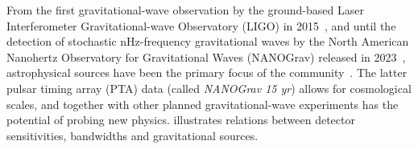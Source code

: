 



















From the first gravitational-wave observation by the ground-based Laser Interferometer Gravitational-wave Observatory (LIGO) in 2015~\cite{abbottObservationGravitationalWaves2016}, %
and until the detection of stochastic nHz-frequency gravitational waves by the North American Nanohertz Observatory for Gravitational Waves (NANOGrav) released in 2023~\citep{agazieNANOGrav15Yr2023a}, astrophysical sources have been the primary focus of the community~\citep{liProbingHighTemperature2023}. The latter pulsar timing array (PTA) data (called \textit{NANOGrav 15 yr}) allows for cosmological scales, and together with other planned gravitational-wave experiments has the potential of probing new physics.  illustrates relations between detector sensitivities, bandwidths and gravitational sources. 

